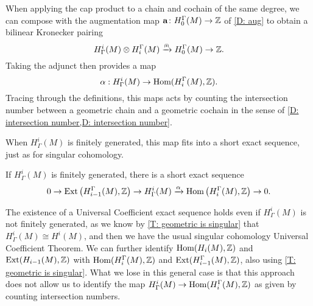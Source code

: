 When applying the cap product to a chain and cochain of the same degree, we can compose with the augmentation map $\mathbf{a} \colon H_0^\Gamma(M) \to \mathbb{Z}$ of \cref{D: aug} to obtain a bilinear Kronecker pairing
$$H^i_\Gamma(M) \otimes H_i^\Gamma(M) \xrightarrow{\nplus} H_0^\Gamma(M) \to \mathbb{Z}.$$
Taking the adjunct then provides a map
$$\alpha: H^i_\Gamma(M) \to \textup{Hom}(H_i^\Gamma(M),\mathbb{Z}).$$
Tracing through the definitions, this maps acts by counting the intersection number between a geometric chain and a geometric cochain in the sense of \cref{D: intersection number,D: intersection number}.

When $H^i_\Gamma(M)$ is finitely generated, this map fits into a short exact sequence, just as for singular cohomology.

\begin{theorem}\label{T: UCT}
	If $H^i_\Gamma(M)$ is finitely generated, there is a short exact sequence
	\[
	0 \to \text{Ext}\left(H_{i-1}^\Gamma(M),\mathbb{Z}\right) \to H^i_\Gamma(M) \xrightarrow{\alpha} \textup{Hom}\left(H_i^\Gamma(M),\mathbb{Z}\right) \to 0.
	\]
\end{theorem}

\begin{remark}
	The existence of a Universal Coefficient exact sequence holds even if $H^i_\Gamma(M)$ is not finitely generated, as we know by \cref{T: geometric is singular} that $H^i_\Gamma(M) \cong H^i(M)$, and then we have the usual singular cohomology Universal Coefficient Theorem.
	We can further identify $\textup{Hom}(H_i(M),\mathbb{Z})$ and $\text{Ext}(H_{i-1}(M),\mathbb{Z})$ with $\textup{Hom}(H^\Gamma_i(M),\mathbb{Z})$ and $\text{Ext}(H^\Gamma_{i-1}(M),\mathbb{Z})$, also using \cref{T: geometric is singular}.
	What we lose in this general case is that this approach does not allow us to identify the map $H^i_\Gamma(M) \to \textup{Hom}(H_i^\Gamma(M),\mathbb{Z})$ as given by counting intersection numbers.
\end{remark}

